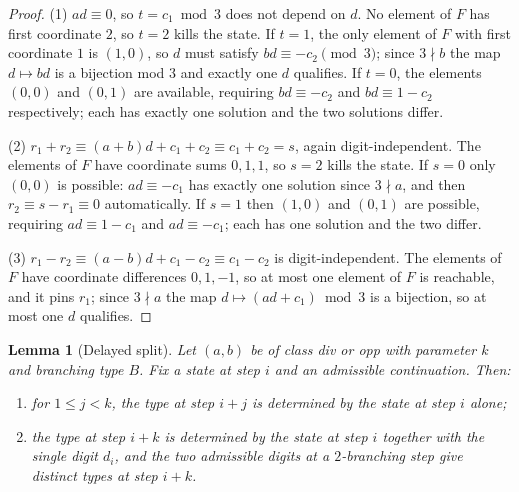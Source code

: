 \documentclass[11pt]{amsart}
\newtheorem{lemma}[theorem]{Lemma}
\theoremstyle{definition}
\theoremstyle{remark}
\begin{document}
\begin{proof}
(1) $ad \equiv 0$, so $t = c_1 \bmod 3$ does not depend on $d$. No element of $F$ has first coordinate $2$, so $t = 2$ kills the state. If $t = 1$, the only element of $F$ with first coordinate $1$ is $(1,0)$, so $d$ must satisfy $bd \equiv -c_2 \pmod 3$; since $3 \nmid b$ the map $d \mapsto bd$ is a bijection mod $3$ and exactly one $d$ qualifies. If $t = 0$, the elements $(0,0)$ and $(0,1)$ are available, requiring $bd \equiv -c_2$ and $bd \equiv 1-c_2$ respectively; each has exactly one solution and the two solutions differ.

(2) $r_1 + r_2 \equiv (a+b)d + c_1 + c_2 \equiv c_1 + c_2 = s$, again digit-independent. The elements of $F$ have coordinate sums $0, 1, 1$, so $s = 2$ kills the state. If $s = 0$ only $(0,0)$ is possible: $ad \equiv -c_1$ has exactly one solution since $3 \nmid a$, and then $r_2 \equiv s - r_1 \equiv 0$ automatically. If $s = 1$ then $(1,0)$ and $(0,1)$ are possible, requiring $ad \equiv 1-c_1$ and $ad \equiv -c_1$; each has one solution and the two differ.

(3) $r_1 - r_2 \equiv (a-b)d + c_1 - c_2 \equiv c_1 - c_2$ is digit-independent. The elements of $F$ have coordinate differences $0, 1, -1$, so at most one element of $F$ is reachable, and it pins $r_1$; since $3 \nmid a$ the map $d \mapsto (ad + c_1) \bmod 3$ is a bijection, so at most one $d$ qualifies.
\end{proof}

\begin{lemma}[Delayed split]
\label{lem:delay}
Let $(a,b)$ be of class div or opp with parameter $k$ and branching type $B$. Fix a state at step $i$ and an admissible continuation. Then:
\begin{enumerate}
  \item for $1 \le j < k$, the type at step $i+j$ is determined by the state at step $i$ alone;
  \item the type at step $i+k$ is determined by the state at step $i$ together with the single digit $d_i$, and the two admissible digits at a $2$-branching step give \emph{distinct} types at step $i+k$.
\end{enumerate}
\end{lemma}
\end{document}
